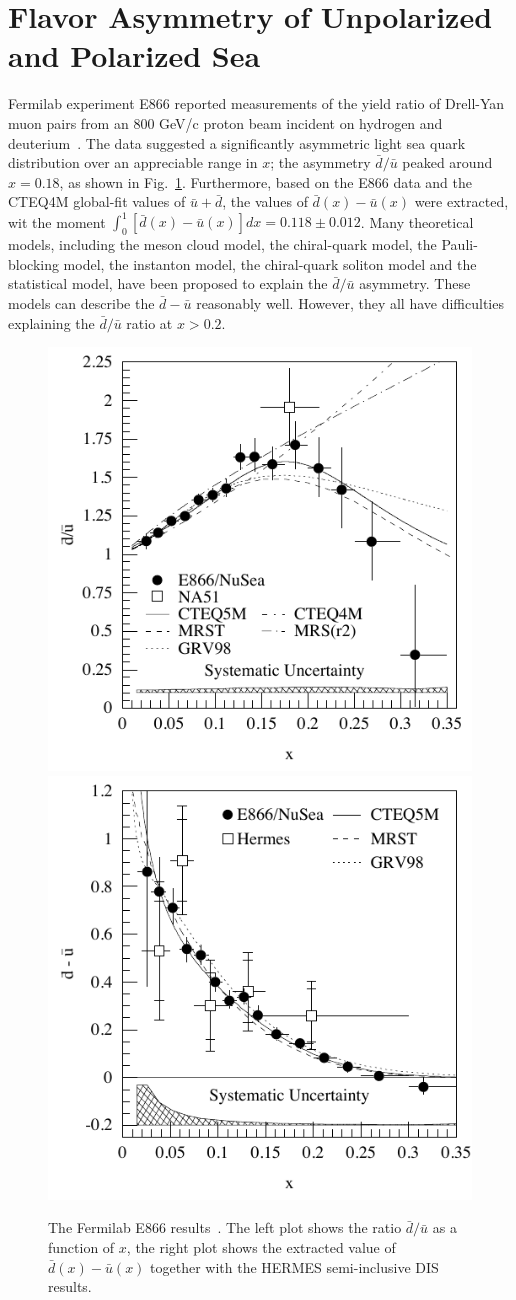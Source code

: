 \section{Flavor Asymmetry of Unpolarized and Polarized Sea}
 Fermilab experiment E866 reported measurements of the 
 yield ratio of Drell-Yan muon pairs
 from an 800 GeV/c proton beam incident on hydrogen and deuterium~\cite{e8661,e8662}. 
The data suggested a significantly  asymmetric light sea quark distribution over an 
 appreciable range in $x$; the asymmetry $\bar{d}/\bar{u}$ peaked around $x=0.18$, as shown in Fig.~\ref{fig:e866}.
 Furthermore, based on the E866 data and the CTEQ4M global-fit values of $\bar{u}+\bar{d}$,  
 the values of $\bar{d}(x) - \bar{u}(x)$ were extracted, wit the moment
 $\int_{0}^{1} \left[ \bar{d}(x) - \bar{u}(x) \right]dx = 0.118 \pm 0.012$.
 Many theoretical models, including the meson cloud model, the chiral-quark model,
the Pauli-blocking model, the instanton model, the chiral-quark soliton model and 
the statistical model, have been proposed to explain the $\bar{d}/\bar{u}$ asymmetry.
These models can describe the $\bar{d}-\bar{u}$ reasonably well. However, they all have difficulties 
explaining the $\bar{d}/\bar{u}$ ratio at $x>0.2$.  
\begin{figure}[htbp]
\centerline{
\includegraphics[width=0.50\linewidth]{figs_xj/e866_dbub.pdf}
\includegraphics[width=0.50\linewidth]{figs_xj/e866_dmu.pdf}
}
\vspace{-2mm}
\caption{The Fermilab E866 results~\protect\cite{e8661,e8662}. 
The left plot shows the ratio  ${\bar d}/{\bar u}$ as a function of $x$, the right plot 
shows the extracted  value of $\bar{d}(x) - \bar{u}(x)$ together with the HERMES semi-inclusive  
DIS results.
}
\label{fig:e866}
\end{figure}
